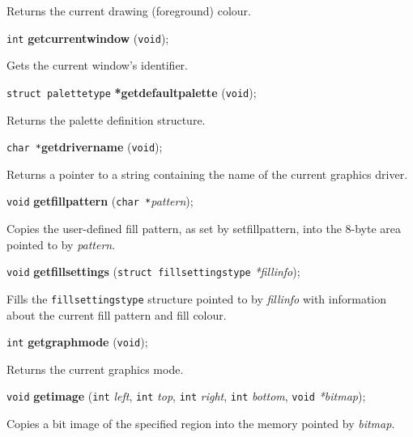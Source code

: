 \documentclass[a4paper,11pt]{article}
\newcommand{\V}{\texttt{void}}      %
\newcommand{\I}{\texttt{int}}       %
\newcommand{\C}{\texttt{char *}}    %
\newcommand{\func}[1]{\textbf{#1}}  %
\newcommand{\A}[1]{\emph{#1}}       %
\newenvironment{bgi}
{ %
  \begin{snugshade}
}
{ %
  \end{snugshade}
}
\begin{document}
Returns the current drawing (foreground) colour.


\begin{bgi}
\I{} \func{getcurrentwindow} (\V{});
\end{bgi}

Gets the current window's identifier.


\begin{bgi}
\texttt{struct palettetype} \func{*getdefaultpalette} (\V{});
\end{bgi}

Returns the palette definition structure.


\begin{bgi}
\C{}\func{getdrivername} (\V{});
\end{bgi}

Returns a pointer to a string containing the name of the current
graphics driver.


\begin{bgi}
\V{} \func{getfillpattern} (\C{}\A{pattern}); 
\end{bgi}

Copies the user-defined fill pattern, as set by setfillpattern, into
the 8-byte area pointed to by \A{pattern}.


\begin{bgi}
\V{} \func{getfillsettings} (\texttt{struct fillsettingstype}
\A{*fillinfo});
\end{bgi}

Fills the \texttt{fillsettingstype} structure pointed to by
\A{fillinfo} with information about the current fill pattern and fill
colour.


\begin{bgi}
\I{} \func{getgraphmode} (\V{});
\end{bgi}

Returns the current graphics mode.


\begin{bgi}
\V{} \func{getimage} (\I{} \A{left}, \I{} \A{top}, \I{} \A{right},
\I{} \A{bottom}, \V{} \A{*bitmap});
\end{bgi}

Copies a bit image of the specified region into the memory pointed by
\A{bitmap}.
\end{document}
